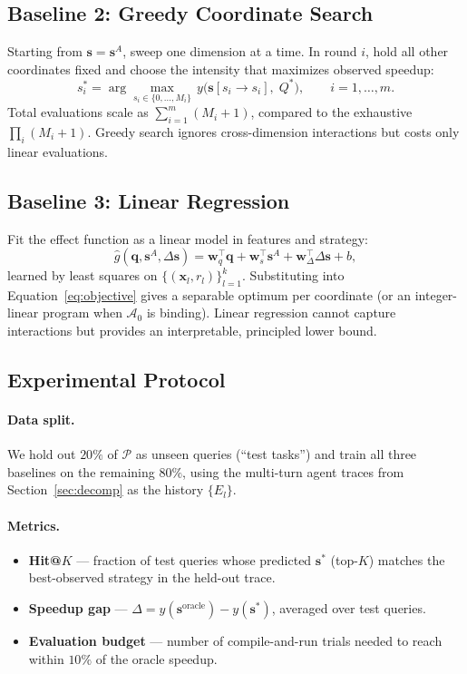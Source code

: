 \documentclass{article}
\begin{document}
\subsection{Baseline 2: Greedy Coordinate Search}
\label{sec:bl2}
Starting from $\mathbf{s} = \mathbf{s}^A$, sweep one dimension at a
time. In round $i$, hold all other coordinates fixed and choose the
intensity that maximizes observed speedup:
\begin{equation}
s_i^* = \arg\max_{s_i \in \{0,\ldots,M_i\}}\,
  y\bigl(\mathbf{s}[s_i \!\to\! s_i],\; Q^*\bigr),
  \qquad i = 1, \ldots, m.
\label{eq:greedy}
\end{equation}
Total evaluations scale as $\sum_{i=1}^{m}(M_i + 1)$, compared to the
exhaustive $\prod_i(M_i+1)$. Greedy search ignores cross-dimension
interactions but costs only linear evaluations.

\subsection{Baseline 3: Linear Regression}
\label{sec:bl3}
Fit the effect function as a linear model in features and strategy:
\begin{equation}
\hat{g}(\mathbf{q}, \mathbf{s}^A, \Delta\mathbf{s})
  = \mathbf{w}_q^{\top}\mathbf{q}
  + \mathbf{w}_s^{\top}\mathbf{s}^A
  + \mathbf{w}_\Delta^{\top}\Delta\mathbf{s} + b,
\label{eq:linreg}
\end{equation}
learned by least squares on $\{(\mathbf{x}_l, r_l)\}_{l=1}^{k}$.
Substituting into Equation~\eqref{eq:objective} gives a separable
optimum per coordinate (or an integer-linear program when
$\mathcal{A}_0$ is binding). Linear regression cannot capture
interactions but provides an interpretable, principled lower bound.

\subsection{Experimental Protocol}

\paragraph{Data split.} We hold out $20\%$ of $\mathcal{P}$ as
unseen queries (``test tasks'') and train all three baselines on the
remaining $80\%$, using the multi-turn agent traces from
Section~\ref{sec:decomp} as the history $\{E_l\}$.

\paragraph{Metrics.}
\begin{itemize}
  \item \textbf{Hit@$K$} --- fraction of test queries whose predicted
  $\mathbf{s}^*$ (top-$K$) matches the best-observed strategy in the
  held-out trace.
  \item \textbf{Speedup gap} --- $\Delta = y(\mathbf{s}^{\mathrm{oracle}})
  - y(\mathbf{s}^*)$, averaged over test queries.
  \item \textbf{Evaluation budget} --- number of compile-and-run trials
  needed to reach within $10\%$ of the oracle speedup.
\end{itemize}
\end{document}

